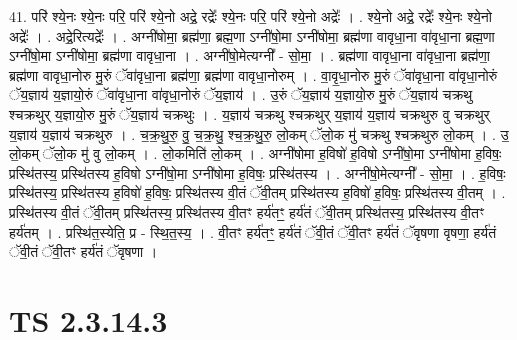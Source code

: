 \documentclass[17pt]{extarticle}
\begin{document}
41. परि॑ श्ये॒नः श्ये॒नः परि॒ परि॑ श्ये॒नो अद्रे॒ रद्रेः᳚ श्ये॒नः परि॒ परि॑ श्ये॒नो अद्रेः᳚ । . श्ये॒नो अद्रे॒ रद्रेः᳚ श्ये॒नः श्ये॒नो अद्रेः᳚ । . अद्रे॒रित्यद्रेः᳚ । . अग्नी॑षोमा॒ ब्रह्म॑णा॒ ब्रह्म॒णा ऽग्नी॑षो॒मा ऽग्नी॑षोमा॒ ब्रह्म॑णा वावृधा॒ना वा॑वृधा॒ना ब्रह्म॒णा ऽग्नी॑षो॒मा ऽग्नी॑षोमा॒ ब्रह्म॑णा वावृधा॒ना । . अग्नी॑षो॒मेत्यग्नी᳚ - सो॒मा॒ । . ब्रह्म॑णा वावृधा॒ना वा॑वृधा॒ना ब्रह्म॑णा॒ ब्रह्म॑णा वावृधा॒नोरु मु॒रुं ॅवा॑वृधा॒ना ब्रह्म॑णा॒ ब्रह्म॑णा वावृधा॒नोरुम् । . वा॒वृ॒धा॒नोरु मु॒रुं ॅवा॑वृधा॒ना वा॑वृधा॒नोरुं ॅय॒ज्ञाय॑ य॒ज्ञायो॒रुं ॅवा॑वृधा॒ना वा॑वृधा॒नोरुं ॅय॒ज्ञाय॑ । . उ॒रुं ॅय॒ज्ञाय॑ य॒ज्ञायो॒रु मु॒रुं ॅय॒ज्ञाय॑ चक्रथु श्चक्रथुर् य॒ज्ञायो॒रु मु॒रुं ॅय॒ज्ञाय॑ चक्रथुः । . य॒ज्ञाय॑ चक्रथु श्चक्रथुर् य॒ज्ञाय॑ य॒ज्ञाय॑ चक्रथुरु वु चक्रथुर् य॒ज्ञाय॑ य॒ज्ञाय॑ चक्रथुरु । . च॒क्र॒थु॒रु॒ वु॒ च॒क्र॒थु॒ श्च॒क्र॒थु॒रु॒ लो॒कम् ॅलो॒क मु॑ चक्रथु श्चक्रथुरु लो॒कम् । . उ॒ लो॒कम् ॅलो॒क मु॑ वु लो॒कम् । . लो॒कमिति॑ लो॒कम् । . अग्नी॑षोमा ह॒विषो॑ ह॒विषो ऽग्नी॑षो॒मा ऽग्नी॑षोमा ह॒विषः॒ प्रस्थि॑तस्य॒ प्रस्थि॑तस्य ह॒विषो ऽग्नी॑षो॒मा ऽग्नी॑षोमा ह॒विषः॒ प्रस्थि॑तस्य । . अग्नी॑षो॒मेत्यग्नी᳚ - सो॒मा॒ । . ह॒विषः॒ प्रस्थि॑तस्य॒ प्रस्थि॑तस्य ह॒विषो॑ ह॒विषः॒ प्रस्थि॑तस्य वी॒तं ॅवी॒तम् प्रस्थि॑तस्य ह॒विषो॑ ह॒विषः॒ प्रस्थि॑तस्य वी॒तम् । . प्रस्थि॑तस्य वी॒तं ॅवी॒तम् प्रस्थि॑तस्य॒ प्रस्थि॑तस्य वी॒तꣳ हर्य॑तꣳ॒॒ हर्य॑तं ॅवी॒तम् प्रस्थि॑तस्य॒ प्रस्थि॑तस्य वी॒तꣳ हर्य॑तम् । . प्रस्थि॑त॒स्येति॒ प्र - स्थि॒त॒स्य॒ । . वी॒तꣳ हर्य॑तꣳ॒॒ हर्य॑तं ॅवी॒तं ॅवी॒तꣳ हर्य॑तं ॅवृषणा वृषणा॒ हर्य॑तं ॅवी॒तं ॅवी॒तꣳ हर्य॑तं ॅवृषणा । \newline
\pagebreak
{}
\section*{ TS 2.3.14.3 }
\end{document}
